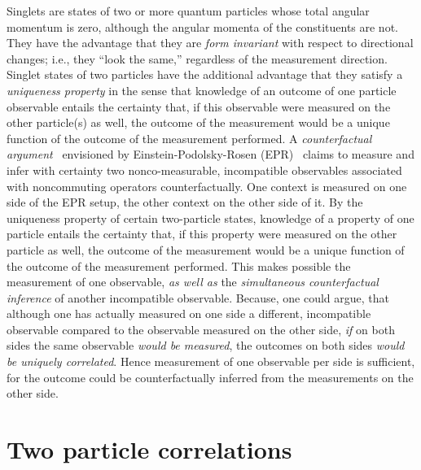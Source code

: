 \documentclass[fleqn,twoside]{article}      %
\begin{document}
Singlets are states of two or more quantum particles whose total angular momentum is zero,
although the angular momenta of the constituents are not.
They have the advantage that
they are {\em form invariant} with respect to directional changes; i.e., they ``look the same,'' regardless of the measurement direction.
Singlet states of two particles have the additional advantage that they satisfy a {\em uniqueness property} \cite{svozil-2006-uniquenessprinciple}
in the sense that knowledge of an outcome of one particle observable entails the certainty that,
if this observable were measured on the other particle(s) as well,
the outcome of the measurement would be a unique function of the outcome of the measurement performed.
A {\em counterfactual argument}~\cite[p.~243]{specker-60} envisioned by
Einstein-Podolsky-Rosen (EPR)~\cite{epr}
claims to measure and infer with certainty two nonco-measurable, incompatible observables associated with noncommuting operators counterfactually.
One context is measured on one side of the EPR setup, the other context on the other side of it.
By the uniqueness property  of certain two-particle states,
knowledge of a property of one particle entails the certainty
that, if this property were measured on the other particle as well, the outcome of the measurement would be
a unique function of the outcome of the measurement performed.
This makes possible the measurement of one observable, {\em as well as} the {\em simultaneous counterfactual inference} of another incompatible observable.
Because, one could argue, that although one has actually measured on one side a different, incompatible observable compared to the observable measured on the other side,
{\em if} on both sides the same  observable {\em would be measured}, the outcomes on both sides {\em would be uniquely correlated}.
Hence measurement of one observable per side is sufficient, for the outcome could be counterfactually inferred from the measurements on the other side.



\section{Two particle correlations}
\end{document}
